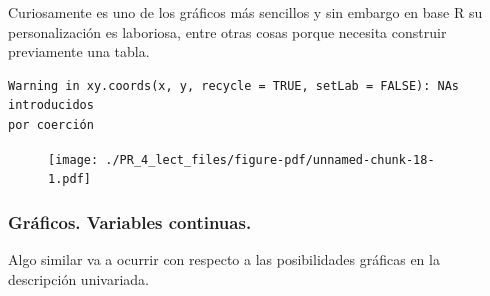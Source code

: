 \documentclass[
  letterpaper,
  DIV=11,
  numbers=noendperiod]{scrreprt}
\newenvironment{Shaded}{\begin{snugshade}}{\end{snugshade}}
\newcommand{\AttributeTok}[1]{\textcolor[rgb]{0.40,0.45,0.13}{#1}}
\newcommand{\DecValTok}[1]{\textcolor[rgb]{0.68,0.00,0.00}{#1}}
\newcommand{\FunctionTok}[1]{\textcolor[rgb]{0.28,0.35,0.67}{#1}}
\newcommand{\NormalTok}[1]{\textcolor[rgb]{0.00,0.23,0.31}{#1}}
\newcommand{\OtherTok}[1]{\textcolor[rgb]{0.00,0.23,0.31}{#1}}
\newcommand{\SpecialCharTok}[1]{\textcolor[rgb]{0.37,0.37,0.37}{#1}}
\newcommand{\StringTok}[1]{\textcolor[rgb]{0.13,0.47,0.30}{#1}}
\begin{document}
Curiosamente es uno de los gráficos más sencillos y sin embargo en base
R su personalización es laboriosa, entre otras cosas porque necesita
construir previamente una tabla.

\begin{Shaded}
\end{Shaded}

\begin{verbatim}
Warning in xy.coords(x, y, recycle = TRUE, setLab = FALSE): NAs introducidos
por coerción
\end{verbatim}

\begin{figure}[H]

{\centering \texttt{[image: ./PR\_4\_lect\_files/figure-pdf/unnamed-chunk-18-1.pdf]}

}

\end{figure}

\hypertarget{gruxe1ficos.-variables-continuas.}{%
\subsubsection{Gráficos. Variables
continuas.}\label{gruxe1ficos.-variables-continuas.}}

Algo similar va a ocurrir con respecto a las posibilidades gráficas en
la descripción univariada.
\end{document}

